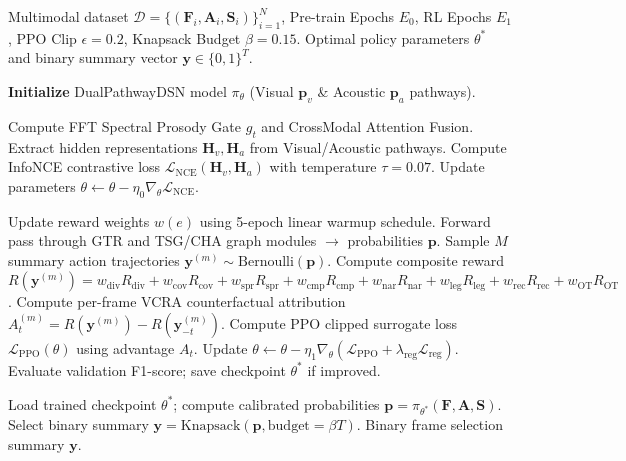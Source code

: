 \documentclass[letterpaper]{article}
\begin{document}
\begin{algorithm}[t]
\caption{LegalSum Training and Inference Pipeline}
\label{alg:legalsum}
\begin{algorithmic}[1]
\REQUIRE Multimodal dataset $\mathcal{D} = \{(\mathbf{F}_i, \mathbf{A}_i, \mathbf{S}_i)\}_{i=1}^N$, Pre-train Epochs $E_0$, RL Epochs $E_1$, PPO Clip $\epsilon=0.2$, Knapsack Budget $\beta = 0.15$.
\ENSURE Optimal policy parameters $\theta^*$ and binary summary vector $\mathbf{y} \in \{0, 1\}^T$.

\STATE \textbf{Initialize} DualPathwayDSN model $\pi_\theta$ (Visual $\mathbf{p}_v$ \& Acoustic $\mathbf{p}_a$ pathways).

\STATE {}
        \STATE Compute FFT Spectral Prosody Gate $g_t$ and CrossModal Attention Fusion.
        \STATE Extract hidden representations $\mathbf{H}_v, \mathbf{H}_a$ from Visual/Acoustic pathways.
        \STATE Compute InfoNCE contrastive loss $\mathcal{L}_{\text{NCE}}(\mathbf{H}_v, \mathbf{H}_a)$ with temperature $\tau=0.07$.
        \STATE Update parameters $\theta \leftarrow \theta - \eta_0 \nabla_\theta \mathcal{L}_{\text{NCE}}$.
    \ENDFOR
\ENDFOR

\STATE {}
    \STATE Update reward weights $w(e)$ using 5-epoch linear warmup schedule.
        \STATE Forward pass through GTR and TSG/CHA graph modules $\rightarrow$ probabilities $\mathbf{p}$.
        \STATE Sample $M$ summary action trajectories $\mathbf{y}^{(m)} \sim \text{Bernoulli}(\mathbf{p})$.
            \STATE Compute composite reward $R(\mathbf{y}^{(m)}) = w_{\text{div}}R_{\text{div}} + w_{\text{cov}}R_{\text{cov}} + w_{\text{spr}}R_{\text{spr}} + w_{\text{cmp}}R_{\text{cmp}} + w_{\text{nar}}R_{\text{nar}} + w_{\text{leg}}R_{\text{leg}} + w_{\text{rec}}R_{\text{rec}} + w_{\text{OT}}R_{\text{OT}}$.
            \STATE Compute per-frame VCRA counterfactual attribution $A_t^{(m)} = R(\mathbf{y}^{(m)}) - R(\mathbf{y}_{-t}^{(m)})$.
        \ENDFOR
            \STATE Compute PPO clipped surrogate loss $\mathcal{L}_{\text{PPO}}(\theta)$ using advantage $A_t$.
            \STATE Update $\theta \leftarrow \theta - \eta_1 \nabla_\theta \left( \mathcal{L}_{\text{PPO}} + \lambda_{\text{reg}} \mathcal{L}_{\text{reg}} \right)$.
        \ENDFOR
    \ENDFOR
    \STATE Evaluate validation F1-score; save checkpoint $\theta^*$ if improved.
\ENDFOR

\STATE {}
\STATE Load trained checkpoint $\theta^*$; compute calibrated probabilities $\mathbf{p} = \pi_{\theta^*}(\mathbf{F}, \mathbf{A}, \mathbf{S})$.
\STATE Select binary summary $\mathbf{y} = \text{Knapsack}(\mathbf{p}, \text{budget}=\beta T)$.
\RETURN Binary frame selection summary $\mathbf{y}$.
\end{algorithmic}
\end{algorithm}
\end{document}
